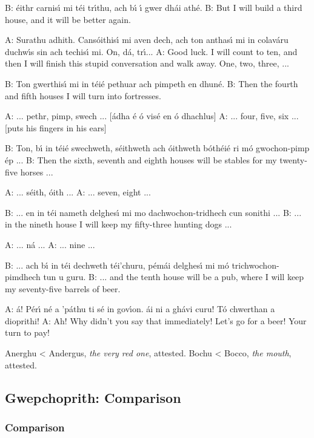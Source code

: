 B: \'{e}ithr carnis\'{\i} mi t\'{e}i tr\'{\i}thu, ach b\'{\i} \'{\i} gwer dh\'{a}i ath\'{e}.
B: But I will build a third house, and it will be better again.

A: Surathu adhith. Cans\'{o}ithis\'{\i} mi aven dech, ach ton anthas\'{\i} mi in colav\'{a}ru duchw\'{\i}s sin ach techis\'{\i} mi. On, d\'{a}, tr\'{\i}...
A: Good luck. I will count to ten, and then I will finish this stupid conversation and walk away. One, two, three, ...

B: Ton gwerthis\'{\i} mi in t\'{e}i\'{e} pethuar ach pimpeth en dhun\'{e}.
B: Then the fourth and fifth houses I will turn into fortresses.

A: ... pethr, pimp, swech ... [\'{a}dha \'{e} \'{o} vis\'{e} en \'{o} dhachlus]
A: ... four, five, six ... [puts his fingers in his ears]

B: Ton, b\'{\i} in t\'{e}i\'{e} swechweth, s\'{e}ithweth ach \'{o}ithweth b\'{o}th\'{e}i\'{e} ri m\'{o} gwochon-pimp \'{e}p ...
B: Then the sixth, seventh and eighth houses will be stables for my twenty-five horses ...

A: ... s\'{e}ith, \'{o}ith ...
A: ... seven, eight ...

B: ... en in t\'{e}i nameth delghes\'{\i} mi mo dachwochon-tridhech cun sonithi ...
B: ... in the nineth house I will keep my fifty-three hunting dogs ...

A: ... n\'{a} ...
A: ... nine ...

B: ... ach b\'{\i} in t\'{e}i dechweth t\'{e}i'churu, p\'{e}m\'{a}i delghes\'{\i} mi m\'{o} trichwochon-pimdhech tun u guru.
B: ... and the tenth house will be a pub, where I will keep my seventy-five barrels of beer.

A: \'{a}! P\'{e}r\'{\i} n\'{e} a 'p\'{a}thu ti s\'{e} in gov\'{\i}on. \'{a}i ni a gh\'{a}vi curu! T\'{o} chwerthan a dioprithi!
A: Ah! Why didn't you say that immediately! Let's go for a beer! Your turn to pay!

Anerghu < Andergus, \textit{the very red one}, attested.
Bochu < Bocco, \textit{the mouth}, attested.

\subsection{Gwepchoprith: Comparison}

\subsubsection{Comparison}


